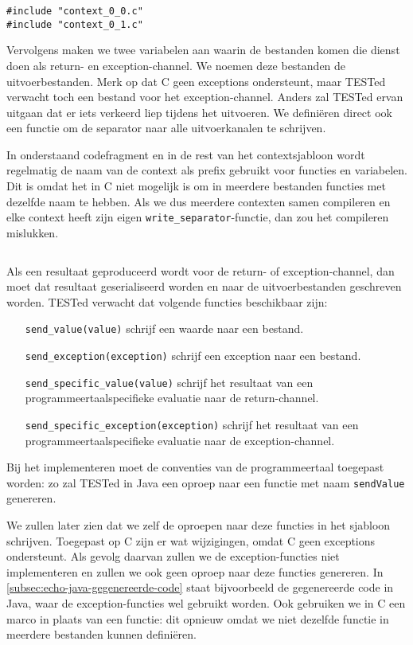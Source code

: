 \begin{verbatim}
#include "context_0_0.c"
#include "context_0_1.c"
\end{verbatim}

Vervolgens maken we twee variabelen aan waarin de bestanden komen die dienst doen als return- en exception-channel.
We noemen deze bestanden de uitvoerbestanden.
Merk op dat C geen exceptions ondersteunt, maar TESTed verwacht toch een bestand voor het exception-channel.
Anders zal TESTed ervan uitgaan dat er iets verkeerd liep tijdens het uitvoeren.
We definiëren direct ook een functie om de separator naar alle uitvoerkanalen te schrijven.

In onderstaand codefragment en in de rest van het contextsjabloon wordt regelmatig de naam van de context als prefix gebruikt voor functies en variabelen.
Dit is omdat het in C niet mogelijk is om in meerdere bestanden functies met dezelfde naam te hebben.
Als we dus meerdere contexten samen compileren en elke context heeft zijn eigen \texttt{write\_separator}-functie, dan zou het compileren mislukken.

\inputminted[firstline=13,lastline=21]{mako}{sources/c-context.mako}

Als een resultaat geproduceerd wordt voor de return- of exception-channel, dan moet dat resultaat geserialiseerd worden en naar de uitvoerbestanden geschreven worden.
TESTed verwacht dat volgende functies beschikbaar zijn:

\begin{itemize}
    \item[\texttt{send\_value(value)}] schrijf een waarde naar een bestand.
    \item[\texttt{send\_exception(exception)}] schrijf een exception naar een bestand.
    \item[\texttt{send\_specific\_value(value)}] schrijf het resultaat van een programmeertaalspecifieke evaluatie naar de return-channel.
    \item[\texttt{send\_specific\_exception(exception)}] schrijf het resultaat van een programmeertaalspecifieke evaluatie naar de exception-channel.
\end{itemize}

Bij het implementeren moet de conventies van de programmeertaal toegepast worden: zo zal TESTed in Java een oproep naar een functie met naam \texttt{sendValue} genereren.

We zullen later zien dat we zelf de oproepen naar deze functies in het sjabloon schrijven.
Toegepast op C zijn er wat wijzigingen, omdat C geen exceptions ondersteunt.
Als gevolg daarvan zullen we de exception-functies niet implementeren en zullen we ook geen oproep naar deze functies genereren.
In \cref{subsec:echo-java-gegenereerde-code} staat bijvoorbeeld de gegenereerde code in Java, waar de exception-functies wel gebruikt worden.
Ook gebruiken we in C een marco in plaats van een functie: dit opnieuw omdat we niet dezelfde functie in meerdere bestanden kunnen definiëren.

